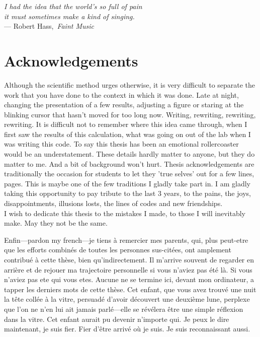 

\begin{flushright}{\slshape    
    I had the idea that the world's so full of pain \\
    it must sometimes make a kind of singing.} \\\medskip
    --- Robert Hass,\, \emph{Faint Music}
\end{flushright}

\begingroup

\let\clearpage\relax
\let\cleardoublepage\relax
\let\cleardoublepage\relax

\chapter*{Acknowledgements} %


Although the scientific method urges otherwise, it is very difficult to separate
the work that you have done to the context in which it was done. Late at night,
changing the presentation of a few results, adjusting a figure or staring at the
blinking cursor that hasn't moved for too long now. Writing, rewriting, rewriting,
rewriting. It is difficult not to
remember where this idea came through, when I first saw the results of this
calculation, what was going on out of the lab when I was writing this code. To say this thesis has been an emotional
rollercoaster would be an understatement.
These details hardly matter to anyone, but they do matter to me. And a bit of
background won't hurt. Thesis acknowledgements are traditionally the occasion
for students to let they 'true selves' out for a few lines, pages. This is maybe
one of the few traditions I gladly take part in. I am gladly
taking this opportunity to pay tribute to the last $3$ years, to the pains, the
joys, disappointments, illusions losts, the lines of codes and new friendships.\\

I wish to dedicate this thesis to the mistakes I made, to those I will
inevitably make. May they not be the same.


Enfin---pardon my french---je tiens \`{a} remercier mes parents, qui, plus
peut-etre que les efforts combin\'es de toutes les personnes sus-cit\'ees, ont
amplement contribu\'e à cette th\`ese, bien qu'indirectement. Il m'arrive
souvent de regarder en arrière et de rejouer ma trajectoire personnelle si vous
n'aviez pas \'et\'e l\`a. Si vous n'aviez pas ete qui vous etes. Aucune ne se
termine ici, devant mon ordinateur, a tapper les derniers mots de cette th\`ese.
Cet enfant, que vous avez trouvé une nuit la t\^ete coll\'ee \`a la vitre,
persuad\'e d'avoir d\'ecouvert une deuxi\`eme lune, perplexe que l'on ne n'en
lui ait jamais parl\'e---elle se r\'ev\'elera \^etre une simple r\'eflexion dans
la vitre. Cet enfant aurait pu devenir n'importe qui. Je peux le dire
maintenant, je suis fier. Fier d'\^etre arriv\'e o\`u je suis. Je suis
reconnaissant aussi. 

